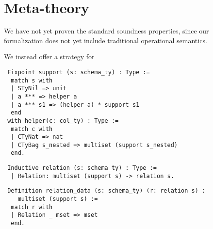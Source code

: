 \section{Meta-theory}
\label{sec:soundness}

We have not yet proven the standard soundness properties, since our formalization
does not yet include traditional operational semantics.

We instead offer a strategy for

\begin{lstlisting}
 Fixpoint support (s: schema_ty) : Type :=
  match s with
  | STyNil => unit
  | a *** => helper a
  | a *** s1 => (helper a) * support s1
  end
 with helper(c: col_ty) : Type :=
  match c with
  | CTyNat => nat
  | CTyBag s_nested => multiset (support s_nested)
  end.
\end{lstlisting}

\begin{lstlisting}
 Inductive relation (s: schema_ty) : Type :=
  | Relation: multiset (support s) -> relation s.
\end{lstlisting}

\begin{lstlisting}
 Definition relation_data (s: schema_ty) (r: relation s) :
    multiset (support s) :=
  match r with
  | Relation _ mset => mset
  end.
\end{lstlisting}
